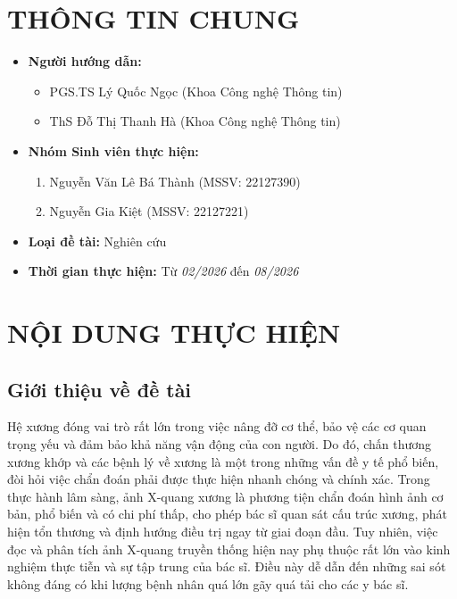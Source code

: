   \section{THÔNG TIN CHUNG}
  \begin{itemize}[label = {}]
      
      \item \textbf{Người hướng dẫn:} 
      \begin{itemize}
          \item PGS.TS Lý Quốc Ngọc (Khoa Công nghệ Thông tin)
          \item ThS Đỗ Thị Thanh Hà (Khoa Công nghệ Thông tin)
      \end{itemize}{}
  
      
      \item \textbf{Nhóm Sinh viên thực hiện:}
      
      \begin{enumerate}
          \item Nguyễn Văn Lê Bá Thành (MSSV: 22127390) 
          \item Nguyễn Gia Kiệt (MSSV: 22127221)
      \end{enumerate}

      \item \textbf{Loại đề tài:} Nghiên cứu
      
      \item \textbf{Thời gian thực hiện:} Từ \textit{02/2026} đến \textit{08/2026}
      
      
  \end{itemize}
  
  \pagebreak 
  
  \section{NỘI DUNG THỰC HIỆN}

  
  \subsection{Giới thiệu về đề tài}

  Hệ xương đóng vai trò rất lớn trong việc nâng đỡ cơ thể, bảo vệ các cơ quan trọng yếu và đảm bảo khả năng vận động của con người. Do đó, chấn thương xương khớp và các bệnh lý về xương là một trong những vấn đề y tế phổ biến, đòi hỏi việc chẩn đoán phải được thực hiện nhanh chóng và chính xác. Trong thực hành lâm sàng, ảnh X-quang xương là phương tiện chẩn đoán hình ảnh cơ bản, phổ biến và có chi phí thấp, cho phép bác sĩ quan sát cấu trúc xương, phát hiện tổn thương và định hướng điều trị ngay từ giai đoạn đầu. Tuy nhiên, việc đọc và phân tích ảnh X-quang truyền thống hiện nay phụ thuộc rất lớn vào kinh nghiệm thực tiễn và sự tập trung của bác sĩ. Điều này dễ dẫn đến những sai sót không đáng có khi lượng bệnh nhân quá lớn gãy quá tải cho các y bác sĩ. 

